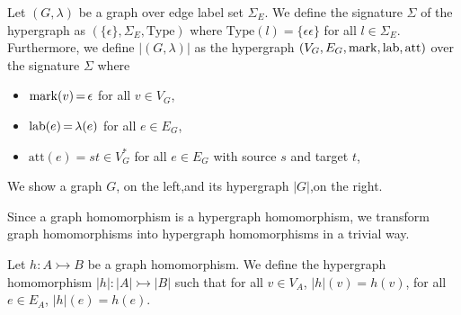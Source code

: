\begin{definition}
    Let $(G,\lambda)$ be a graph over edge label set $\Sigma_E$.
    We define the signature $\Sigma$ of the hypergraph as
    $(\{\epsilon\}, \Sigma_E, \text{Type})$ where $\text{Type}(l) \mathop{=} \{\epsilon\epsilon\}$ for all $l \mathop{\in} \Sigma_E$. 
    Furthermore, we define $|(G,\lambda)|$ as the hypergraph $(V_G, E_G,\operatorname{mark}, \operatorname{lab},\text{att})$ over the signature $\Sigma$ where
    \begin{itemize}
        \item $\operatorname{mark}(v) \mathop{=} \epsilon$ for all $v \mathop{\in} V_G$,
        \item $\operatorname{lab}(e) \mathop{=} \lambda(e)$ for all $e \mathop{\in} E_G$,
        \item $\text{att}(e) \mathop{=} st \mathop{\in} V_G^*$ for all $e \mathop{\in} E_G$ with source $s$ and target $t$,
    \end{itemize}
\end{definition}

\begin{example}
    We show a graph $G$, on the left,and its hypergraph $|G|$,on the right.

    \hspace{1cm}
\end{example}

Since a graph homomorphism is a hypergraph homomorphism, we transform graph homomorphisms into hypergraph homomorphisms in a trivial way.
\begin{definition}
    Let $h: A \rightarrowtail B$ be a graph homomorphism. We define the hypergraph homomorphism $|h| : |A| \rightarrowtail |B|$ such that for all $v \mathop{\in} V_A$, $|h|(v) \mathop{=} h(v)$, for all $e \mathop{\in} E_A$, $|h|(e) \mathop{=} h(e)$.
\end{definition}

